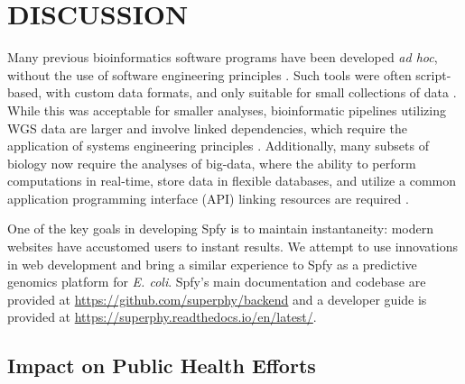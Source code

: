 \documentclass[a4,center,fleqn]{NAR}
\begin{document}


\section{DISCUSSION}

Many previous bioinformatics software programs have been developed \textit{ad hoc}, without the use of software engineering principles \cite{de2015trends}.
Such tools were often script-based, with custom data formats, and only suitable for small collections of data \cite{de2015trends}.
While this was acceptable for smaller analyses, bioinformatic pipelines utilizing WGS data are larger and involve linked dependencies, which require the application of systems engineering principles \cite{schatz2015biological}.
Additionally, many subsets of biology now require the analyses of big-data, where the ability to perform computations in real-time, store data in flexible databases, and utilize a common application programming interface (API) linking resources are required \cite{swaminathan2016review}.

One of the key goals in developing Spfy is to maintain instantaneity: modern websites have accustomed users to instant results.
We attempt to use innovations in web development and bring a similar experience to Spfy as a predictive genomics platform for \textit{E. coli}.
Spfy's main documentation and codebase are provided at \url{https://github.com/superphy/backend} and a developer guide is provided at \url{https://superphy.readthedocs.io/en/latest/}.

\subsection{Impact on Public Health Efforts}
\end{document}
